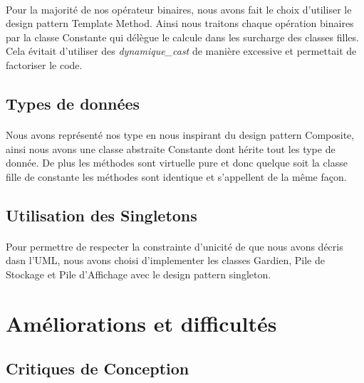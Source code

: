 \documentclass[a4paper,12pt]{article}
\begin{document}
			\paragraph{}Pour la majorité de nos opérateur binaires, nous avons fait le choix d'utiliser le design pattern Template Method. Ainsi nous traitons chaque opération binaires par la classe Constante qui délègue le calcule dans les surcharge des classes filles. Cela évitait d’utiliser des \emph{dynamique\_cast} de manière excessive et permettait de factoriser le code.

	\subsection{Types de données}
		\paragraph{}Nous avons représenté nos type en nous inspirant du design pattern Composite, ainsi nous avons une classe abstraite Constante dont hérite tout les type de donnée. De plus les méthodes sont virtuelle pure et donc quelque soit la classe fille de constante les méthodes sont identique et s'appellent de la même façon.
		
	\subsection{Utilisation des Singletons}
		\paragraph{}Pour permettre de respecter la constrainte d'unicité de que nous avons décris dasn l'UML, nous avons choisi d'implementer les classes Gardien, Pile de Stockage et Pile d'Affichage avec le design pattern singleton.
		
\section{Améliorations et difficultés}
	\subsection{Critiques de Conception}
	
\end{document}
